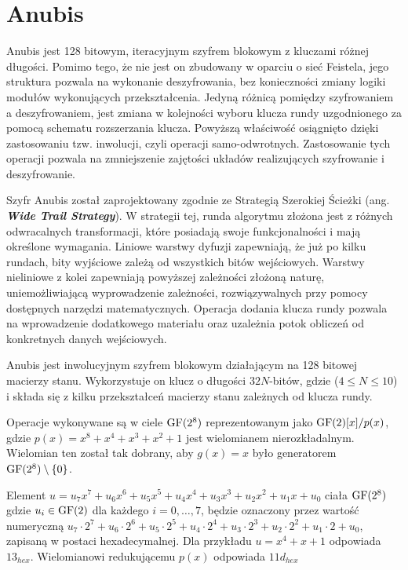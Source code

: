 \section{Anubis}
Anubis jest 128 bitowym, iteracyjnym szyfrem blokowym z kluczami różnej długości. Pomimo tego, że nie jest on zbudowany w oparciu o sieć Feistela, jego struktura pozwala na wykonanie deszyfrowania, bez konieczności zmiany logiki modułów wykonujących przekształcenia. Jedyną różnicą pomiędzy szyfrowaniem a deszyfrowaniem, jest zmiana w kolejności wyboru klucza rundy uzgodnionego za pomocą schematu rozszerzania klucza. Powyższą właściwość osiągnięto dzięki zastosowaniu tzw. inwolucji, czyli operacji samo-odwrotnych. Zastosowanie tych operacji pozwala na zmniejszenie zajętości układów realizujących szyfrowanie i deszyfrowanie. 

Szyfr Anubis został zaprojektowany zgodnie ze Strategią Szerokiej Ścieżki (ang. \textbf{\textit{Wide Trail Strategy}}). W strategii tej, runda algorytmu złożona jest z różnych odwracalnych transformacji, które posiadają swoje funkcjonalności i mają określone wymagania. Liniowe warstwy dyfuzji zapewniają, że już po kilku rundach, bity wyjściowe zależą od wszystkich bitów wejściowych. Warstwy nieliniowe z kolei zapewniają powyższej zależności złożoną naturę, uniemożliwiającą wyprowadzenie zależności, rozwiązywalnych przy pomocy dostępnych narzędzi matematycznych. Operacja dodania klucza rundy pozwala na wprowadzenie dodatkowego materiału oraz uzależnia potok obliczeń od konkretnych danych wejściowych. 

Anubis jest inwolucyjnym szyfrem blokowym działającym na 128 bitowej macierzy stanu. Wykorzystuje on klucz o długości $32N$-bitów, gdzie ($4 \leqslant N\leqslant 10$) i składa się z kilku przekształceń macierzy stanu zależnych od klucza rundy.

Operacje wykonywane są w ciele $\mathrm{GF}(2^8)$ reprezentowanym jako $\mathrm{GF}(2)[x]/p(x)$, gdzie $p(x) = x^8 + x^4 + x^3 + x^2 + 1$ jest wielomianem nierozkładalnym. Wielomian ten został tak dobrany, aby $g(x) = x$ było generatorem $\mathrm{GF}(2^8) \setminus \{0\}$.

Element $u = u_7 x^7 + u_6 x^6 + u_5 x^5 + u_4 x^4 + u_3 x^3 + u_2 x^2 + u_1 x + u_0$ ciała $\mathrm{GF}(2^8)$ gdzie $u_i \in \mathrm{GF}(2)$ dla każdego $i = 0, \dots, 7$, będzie oznaczony przez wartość numeryczną $u_7
\cdot 2^7 + u_6 \cdot 2^6 + u_5 \cdot 2^5 + u_4 \cdot 2^4 + u_3
\cdot 2^3 + u_2 \cdot 2^2 + u_1 \cdot 2 + u_0$, zapisaną w postaci hexadecymalnej. Dla przykładu $u = x^4 + x + 1$ odpowiada ${13_{hex}}$. Wielomianowi redukującemu $p(x)$ odpowiada ${11d_{hex}}$


